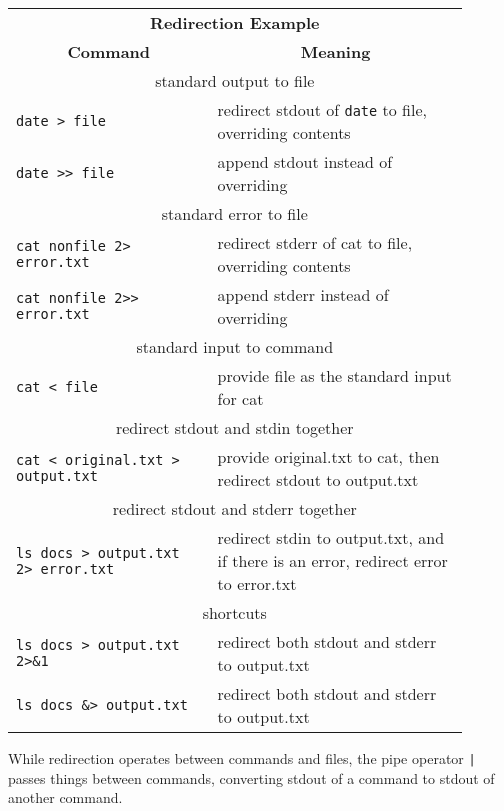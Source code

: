 \documentclass[landscape,a0paper,fontscale=0.285]{baposter} %
\begin{document}
\begin{poster}
{\begin{tabular}{p{0.4\linewidth}p{0.5\linewidth}}
\multicolumn{2}{c}{\textbf{Redirection Example }} \\
\multicolumn{1}{c}{\textbf{Command}}  & \multicolumn{1}{c}{\textbf{Meaning}} \\
\hline
\multicolumn{2}{c}{standard output to file} \\
\hline
\texttt{\small{date} > file} & redirect stdout of \texttt{\small{date}} to file, overriding contents \\
\texttt{\small{date >> file}} & append stdout instead of overriding \\
\hline
\multicolumn{2}{c}{standard error to file} \\
\hline
\texttt{\small{\texttt{cat nonfile 2> error.txt}}} & redirect stderr of cat to file, overriding contents \\
\texttt{\small{\texttt{cat nonfile 2>> error.txt}}} & append stderr instead of overriding \\
\hline
\multicolumn{2}{c}{standard input to command} \\
\hline
\texttt{\small{\texttt{cat < file}}} & provide file as the standard input for cat \\
\hline
\multicolumn{2}{c}{redirect stdout and stdin together} \\
\hline
\texttt{\small{cat < original.txt > output.txt}} & provide original.txt to cat, then redirect stdout to output.txt \\
\hline
\multicolumn{2}{c}{redirect stdout and stderr together} \\
\hline
\texttt{\small{ls docs > output.txt 2> error.txt}} & redirect stdin to output.txt, and if there is an error, redirect error to error.txt \\
\hline
\multicolumn{2}{c}{shortcuts} \\
\hline

\texttt{\small{ls docs > output.txt 2>\&1}} & redirect both stdout and stderr to output.txt \\
\texttt{\small{ls docs \&> output.txt}} & redirect both stdout and stderr to output.txt \\

\end{tabular}


While redirection operates between commands and files, the pipe operator \texttt{|} passes things between commands, converting stdout of a command to stdout of another command. \\

}
\end{poster}
\end{document}
